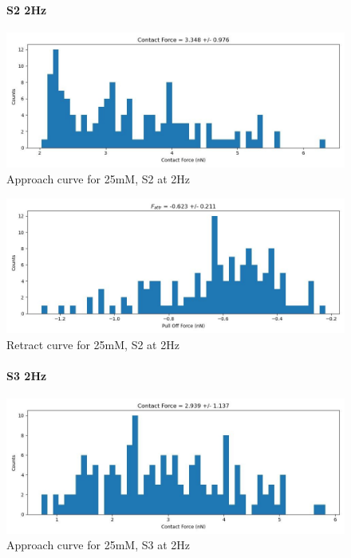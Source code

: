 \newpage


\begin{figure}[h!]
\paragraph{S2 2Hz}
\centering
\includegraphics[width=\textwidth]{chapter7/Tip speed/25mM/S2 2Hz/approach_f_c_hist.jpg}
\caption{Approach curve for 25mM, S2 at 2Hz}
\end{figure}

\begin{figure}[h!]
\centering
\includegraphics[width=\textwidth]{chapter7/Tip speed/25mM/S2 2Hz/retract_f_a_hist.jpg}
\caption{Retract curve for 25mM, S2 at 2Hz}
\end{figure}

\newpage


\begin{figure}[h!]
\paragraph{S3 2Hz}
\centering
\includegraphics[width=\textwidth]{chapter7/Tip speed/25mM/S3 2Hz/approach_f_c_hist.jpg}
\caption{Approach curve for 25mM, S3 at 2Hz}
\end{figure}

